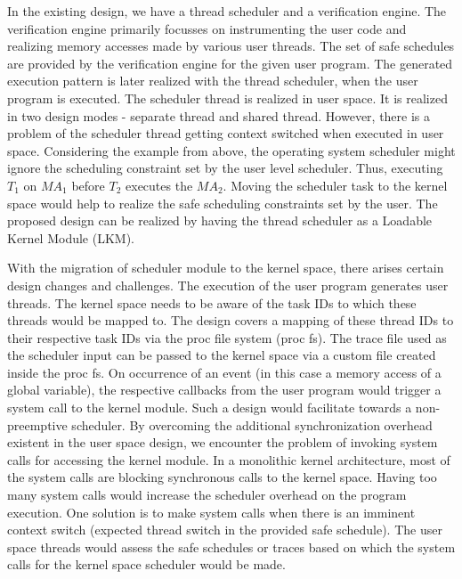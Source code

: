 \documentclass[12pt]{article}
\begin{document}
In the existing design, we have a thread scheduler and a verification engine.  
The verification engine primarily focusses on instrumenting the user code and realizing memory accesses made by various user threads. 
The set of safe schedules are provided by the verification engine for the given user program. 
The generated execution pattern is later realized with the thread scheduler, when the user program is executed. 
The scheduler thread is realized in user space. 
It is realized in two design modes - separate thread and shared thread. 
However, there is a problem of the scheduler thread getting context switched when executed in user space. 
Considering the example from above, the operating system scheduler might ignore the scheduling constraint set by the user level scheduler. 
Thus, executing $T_{1}$ on $MA_{1}$ before $T_{2}$ executes the $MA_{2}$. 
Moving the scheduler task to the kernel space would help to realize the safe scheduling constraints set by the user. 
The proposed design can be realized by having the thread scheduler as a Loadable Kernel Module (LKM). 

With the migration of scheduler module to the kernel space, there arises certain design changes and challenges. 
The execution of the user program generates user threads. 
The kernel space needs to be aware of the task IDs to which these threads would be mapped to. 
The design covers a mapping of these thread IDs to their respective task IDs via the proc file system (proc fs). 
The trace file used as the scheduler input can be passed to the kernel space via a custom file created inside the proc fs. 
On occurrence of an event (in this case a memory access of a global variable), the respective callbacks from the user program would trigger a system call to the kernel module. 
Such a design would facilitate towards a non-preemptive scheduler. 
By overcoming the additional synchronization overhead existent in the user space design, we encounter the problem of invoking system calls for accessing the kernel module. 
In a monolithic kernel architecture, most of the system calls are blocking synchronous calls to the kernel space. 
Having too many system calls would increase the scheduler overhead on the program execution. 
One solution is to make system calls when there is an imminent context switch (expected thread switch in the provided safe schedule). 
The user space threads would assess the safe schedules or traces based on which the system calls for the kernel space scheduler would be made. 
\end{document}
